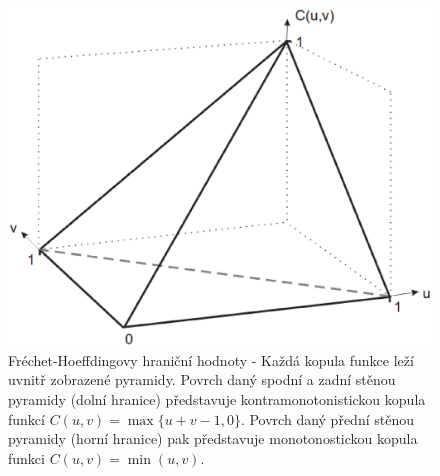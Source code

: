 \begin{figure}[htp]
\centering
\includegraphics[scale = 0.35]{pictures/copula_boundary.eps}
\caption{Fréchet-Hoeffdingovy hraniční hodnoty - Každá kopula funkce leží uvnitř zobrazené pyramidy. Povrch daný spodní a zadní stěnou pyramidy (dolní hranice) představuje kontramonotonistickou kopula funkcí $C(u, v) = \max\{u + v -1, 0\}$. Povrch daný přední stěnou pyramidy (horní hranice) pak představuje monotonostickou kopula funkci $C(u, v) = \min(u, v)$.}
\label{copula_boundary}
\end{figure} 

